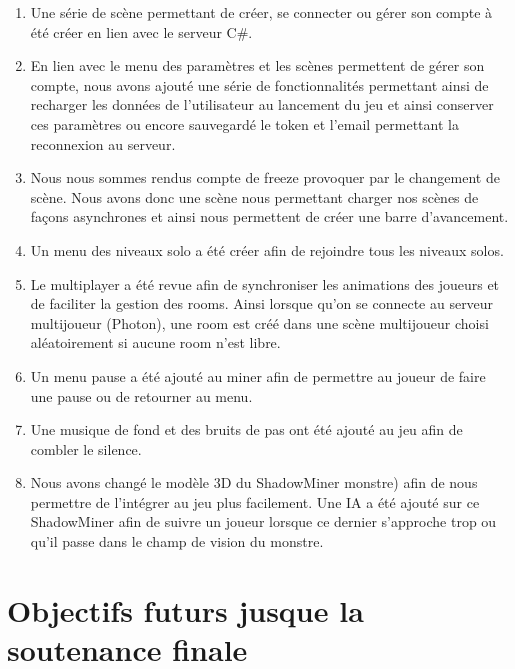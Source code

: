 \documentclass[titlepage, 13px, a4paper]{report}
\begin{document}
{\begin{enumerate}
		de changer les touches, de changer le volume sonore de la musique et des effets sonores. \\
	\item Une série de scène permettant de créer, se connecter ou gérer son compte à été créer en lien avec le serveur C\#. \newpage
	\item En lien avec le menu des paramètres et les scènes permettent de gérer son compte, 
		nous avons ajouté une série de fonctionnalités permettant ainsi de recharger les données de l’utilisateur au lancement du jeu 
		et ainsi conserver ces paramètres ou encore sauvegardé le token et l’email permettant la reconnexion au serveur. \\
	\item Nous nous sommes rendus compte de freeze provoquer par le changement de scène. Nous avons donc une scène 
		nous permettant charger nos scènes de façons asynchrones et ainsi nous permettent de créer une barre d’avancement. \\
	\item Un menu des niveaux solo a été créer afin de rejoindre tous les niveaux solos. \\
	\item Le multiplayer a été revue afin de synchroniser les animations des joueurs et de faciliter la gestion des rooms.
		Ainsi lorsque qu’on se connecte au serveur multijoueur (Photon), une room est créé dans une scène multijoueur 
		choisi aléatoirement si aucune room n’est libre. \\
	\item Un menu pause a été ajouté au miner afin de permettre au joueur de faire une pause ou de retourner au menu. \\
	\item Une musique de fond et des bruits de pas ont été ajouté au jeu afin de combler le silence. \\
	\item Nous avons changé le modèle 3D du ShadowMiner monstre) afin de nous permettre de l’intégrer au jeu plus facilement.
		Une IA a été ajouté sur ce ShadowMiner afin de suivre un joueur lorsque ce dernier s’approche trop ou qu’il passe 
		dans le champ de vision du monstre. \\

\end{enumerate}}



\newpage




\section{Objectifs futurs jusque la soutenance finale} 
\end{document}
